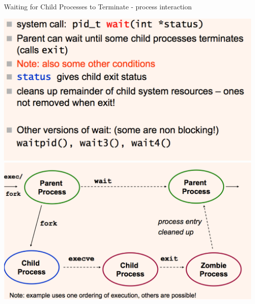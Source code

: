 \documentclass[11pt,a4paper]{article}
\theoremstyle{definition}
\begin{document}
\begin{tcolorbox}
	\textsf{Waiting for Child Processes to Terminate - process interaction}
	
	\includegraphics[scale=0.27]{m1/parentWait1}
	\includegraphics[scale=0.27]{m1/parentWait2}
	\centering
\end{tcolorbox}
\end{document}
